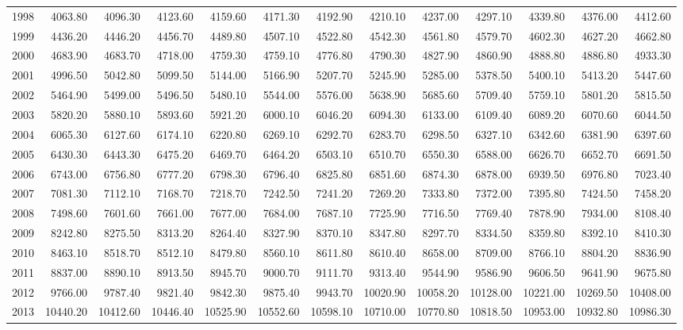 \begin{longtable}{rrrrrrrrrrrrr}
  1998 & 4063.80 & 4096.30 & 4123.60 & 4159.60 & 4171.30 & 4192.90 & 4210.10 & 4237.00 & 4297.10 & 4339.80 & 4376.00 & 4412.60 \\ 
  1999 & 4436.20 & 4446.20 & 4456.70 & 4489.80 & 4507.10 & 4522.80 & 4542.30 & 4561.80 & 4579.70 & 4602.30 & 4627.20 & 4662.80 \\ 
  2000 & 4683.90 & 4683.70 & 4718.00 & 4759.30 & 4759.10 & 4776.80 & 4790.30 & 4827.90 & 4860.90 & 4888.80 & 4886.80 & 4933.30 \\ 
  2001 & 4996.50 & 5042.80 & 5099.50 & 5144.00 & 5166.90 & 5207.70 & 5245.90 & 5285.00 & 5378.50 & 5400.10 & 5413.20 & 5447.60 \\ 
  2002 & 5464.90 & 5499.00 & 5496.50 & 5480.10 & 5544.00 & 5576.00 & 5638.90 & 5685.60 & 5709.40 & 5759.10 & 5801.20 & 5815.50 \\ 
  2003 & 5820.20 & 5880.10 & 5893.60 & 5921.20 & 6000.10 & 6046.20 & 6094.30 & 6133.00 & 6109.40 & 6089.20 & 6070.60 & 6044.50 \\ 
  2004 & 6065.30 & 6127.60 & 6174.10 & 6220.80 & 6269.10 & 6292.70 & 6283.70 & 6298.50 & 6327.10 & 6342.60 & 6381.90 & 6397.60 \\ 
  2005 & 6430.30 & 6443.30 & 6475.20 & 6469.70 & 6464.20 & 6503.10 & 6510.70 & 6550.30 & 6588.00 & 6626.70 & 6652.70 & 6691.50 \\ 
  2006 & 6743.00 & 6756.80 & 6777.20 & 6798.30 & 6796.40 & 6825.80 & 6851.60 & 6874.30 & 6878.00 & 6939.50 & 6976.80 & 7023.40 \\ 
  2007 & 7081.30 & 7112.10 & 7168.70 & 7218.70 & 7242.50 & 7241.20 & 7269.20 & 7333.80 & 7372.00 & 7395.80 & 7424.50 & 7458.20 \\ 
  2008 & 7498.60 & 7601.60 & 7661.00 & 7677.00 & 7684.00 & 7687.10 & 7725.90 & 7716.50 & 7769.40 & 7878.90 & 7934.00 & 8108.40 \\ 
  2009 & 8242.80 & 8275.50 & 8313.20 & 8264.40 & 8327.90 & 8370.10 & 8347.80 & 8297.70 & 8334.50 & 8359.80 & 8392.10 & 8410.30 \\ 
  2010 & 8463.10 & 8518.70 & 8512.10 & 8479.80 & 8560.10 & 8611.80 & 8610.40 & 8658.00 & 8709.00 & 8766.10 & 8804.20 & 8836.90 \\ 
  2011 & 8837.00 & 8890.10 & 8913.50 & 8945.70 & 9000.70 & 9111.70 & 9313.40 & 9544.90 & 9586.90 & 9606.50 & 9641.90 & 9675.80 \\ 
  2012 & 9766.00 & 9787.40 & 9821.40 & 9842.30 & 9875.40 & 9943.70 & 10020.90 & 10058.20 & 10128.00 & 10221.00 & 10269.50 & 10408.00 \\ 
  2013 & 10440.20 & 10412.60 & 10446.40 & 10525.90 & 10552.60 & 10598.10 & 10710.00 & 10770.80 & 10818.50 & 10953.00 & 10932.80 & 10986.30 \\ 

\end{longtable}
